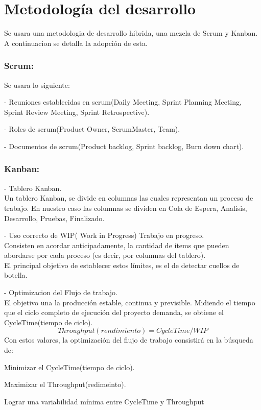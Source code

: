 \documentclass[11pt,letterpaper]{report}
\begin{document}
\section{Metodología del desarrollo}
Se usara una metodologia de desarrollo hibrida, una mezcla de Scrum y Kanban.\\
A continuacion se detalla la adopción de esta.
\subsubsection{Scrum:} 
Se usara lo siguiente:
\begin{description}
	\item - Reuniones establecidas en scrum(Daily Meeting, Sprint Planning Meeting, Sprint Review Meeting, Sprint Retrospective).
	\item - Roles de scrum(Product Owner, ScrumMaster, Team).
	\item - Documentos de scrum(Product backlog, Sprint backlog, Burn down chart).
\end{description}
\subsubsection{Kanban:} 
\begin{description}
	\item - Tablero Kanban.\\
	Un tablero Kanban, se divide en columnas las cuales representan un proceso de trabajo. En nuestro caso las columnas se dividen en Cola de Espera, Analisis, Desarrollo, Pruebas, Finalizado.
	\item - Uso correcto de WIP( Work in Progress) Trabajo en progreso.\\
	Consisten en acordar anticipadamente, la cantidad de ítems que pueden abordarse por cada proceso (es decir, por columnas del tablero).\\
	El principal objetivo de establecer estos límites, es el de detectar cuellos de botella. 
	\item - Optimizacion del Flujo de trabajo.\\
	El objetivo una la producción estable, continua y previsible. Midiendo el tiempo que el ciclo completo de ejecución del proyecto demanda, se obtiene el CycleTime(tiempo de ciclo).
	\begin{equation}
	Throughput(rendimiento) = CycleTime/WIP
	\end{equation}
	Con estos valores, la optimización del flujo de trabajo consistirá en la búsqueda de:
	\begin{description}
		\item Minimizar el CycleTime(tiempo de ciclo).
		\item Maximizar el Throughput(redimeinto).
		\item Lograr una variabilidad mínima entre CycleTime y Throughput
	\end{description}
\end{description}
\end{document}
